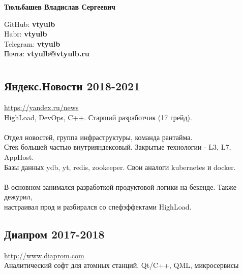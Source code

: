 \documentclass[a4paper, 12pt]{article}
\begin{document}
\begin{center}
    \huge\textbf{Тюльбашев Владислав Сергеевич}\\
\end{center}
\null\hfill GitHub: \textbf{vtyulb} \\
\null\hfill Habr: \textbf{vtyulb} \\
\null\hfill Telegram: \textbf{vtyulb} \\
\null\hfill Почта: \textbf{vtyulb@vtyulb.ru} \\

\section*{} {
    \subsection*{Яндекс.Новости 2018-2021} {
        \href{https://yandex.ru/news}{https://yandex.ru/news} \\
        HighLoad, DevOps, C++. Старший разработчик (17 грейд). \\ \\
        Отдел новостей, группа инфраструктуры, команда рантайма. \\
        Стек большей частью внутрияндексовый. Закрытые технологии - L3, L7, AppHost. \\
        Базы данных ydb, yt, redis, zookeeper. Свои аналоги kubernetes и docker. \\ \\
        В основном занимался разработкой продуктовой логики на бекенде. Также дежурил, \\
        настраивал прод и разбирался со спефэффектами HighLoad.
    }
        
    \subsection*{Диапром 2017-2018} {
        \href{http://www.diaprom.com/}{http://www.diaprom.com} \\
        Аналитический софт для атомных станций. Qt/C++, QML, микросервисы
    }
    
}
\end{document}
